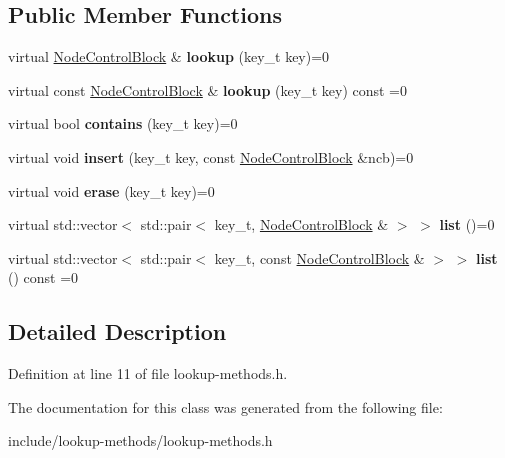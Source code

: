 \subsection*{Public Member Functions}
\begin{DoxyCompactItemize}
\item 
\mbox{\label{class_hash_octree_1_1_lookup_method_a58a239f1c1ce4da578230e364d5c4657}} 
virtual \mbox{\hyperlink{class_hash_octree_1_1_node_control_block}{Node\+Control\+Block}} \& {\bfseries lookup} (key\+\_\+t key)=0
\item 
\mbox{\label{class_hash_octree_1_1_lookup_method_a5d64b539b3f099248706b5cd8ad0ef2a}} 
virtual const \mbox{\hyperlink{class_hash_octree_1_1_node_control_block}{Node\+Control\+Block}} \& {\bfseries lookup} (key\+\_\+t key) const =0
\item 
\mbox{\label{class_hash_octree_1_1_lookup_method_adcf3e2deab4804f5141361895a0ccf0a}} 
virtual bool {\bfseries contains} (key\+\_\+t key)=0
\item 
\mbox{\label{class_hash_octree_1_1_lookup_method_a955f05c8d0b805800d8a219729c11d5e}} 
virtual void {\bfseries insert} (key\+\_\+t key, const \mbox{\hyperlink{class_hash_octree_1_1_node_control_block}{Node\+Control\+Block}} \&ncb)=0
\item 
\mbox{\label{class_hash_octree_1_1_lookup_method_a23e22680e713b8bce7d28140dade2a95}} 
virtual void {\bfseries erase} (key\+\_\+t key)=0
\item 
\mbox{\label{class_hash_octree_1_1_lookup_method_aa0afc2536256ef56a317162a16c361b1}} 
virtual std\+::vector$<$ std\+::pair$<$ key\+\_\+t, \mbox{\hyperlink{class_hash_octree_1_1_node_control_block}{Node\+Control\+Block}} \& $>$ $>$ {\bfseries list} ()=0
\item 
\mbox{\label{class_hash_octree_1_1_lookup_method_a88d11f75aa4310412670e386a7fab056}} 
virtual std\+::vector$<$ std\+::pair$<$ key\+\_\+t, const \mbox{\hyperlink{class_hash_octree_1_1_node_control_block}{Node\+Control\+Block}} \& $>$ $>$ {\bfseries list} () const =0
\end{DoxyCompactItemize}


\subsection{Detailed Description}


Definition at line 11 of file lookup-\/methods.\+h.



The documentation for this class was generated from the following file\+:\begin{DoxyCompactItemize}
\item 
include/lookup-\/methods/lookup-\/methods.\+h\end{DoxyCompactItemize}
